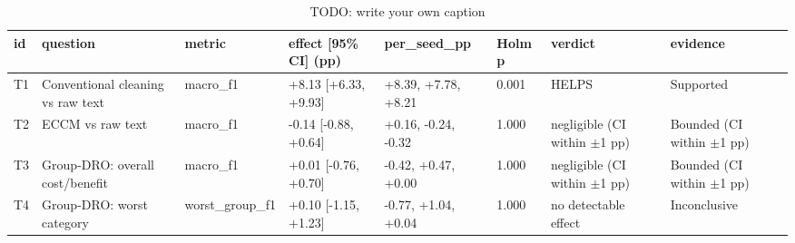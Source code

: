 \begin{table}
\caption{TODO: write your own caption}\label{tab:T16-amazon-text-family}
\scriptsize
\begin{tabularx}{\textheight}{l>{\raggedright\arraybackslash}Xllll>{\raggedright\arraybackslash}X>{\raggedright\arraybackslash}X}
\toprule
id & question & metric & effect [95\% CI] (pp) & per\_\allowbreak{}seed\_\allowbreak{}pp & Holm p & verdict & evidence \\
\midrule
T1 & Conventional cleaning vs raw text & macro\_\allowbreak{}f1 & +8.13 [+6.33, +9.93] & +8.39, +7.78, +8.21 & 0.001 & HELPS & Supported \\
T2 & ECCM vs raw text & macro\_\allowbreak{}f1 & -0.14 [-0.88, +0.64] & +0.16, -0.24, -0.32 & 1.000 & negligible (CI within $\pm$1 pp) & Bounded (CI within $\pm$1 pp) \\
T3 & Group-DRO: overall cost/\allowbreak{}benefit & macro\_\allowbreak{}f1 & +0.01 [-0.76, +0.70] & -0.42, +0.47, +0.00 & 1.000 & negligible (CI within $\pm$1 pp) & Bounded (CI within $\pm$1 pp) \\
T4 & Group-DRO: worst category & worst\_\allowbreak{}group\_\allowbreak{}f1 & +0.10 [-1.15, +1.23] & -0.77, +1.04, +0.04 & 1.000 & no detectable effect & Inconclusive \\
\bottomrule
\end{tabularx}
\end{table}
